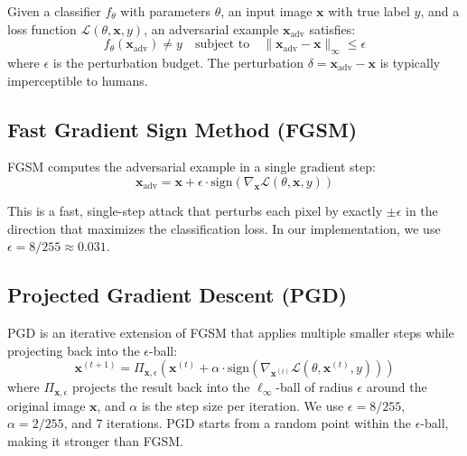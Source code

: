 \documentclass[12pt, a4paper]{article}
\begin{document}
Given a classifier $f_\theta$ with parameters $\theta$, an input image
$\mathbf{x}$ with true label $y$, and a loss function
$\mathcal{L}(\theta, \mathbf{x}, y)$, an adversarial example
$\mathbf{x}_{\mathrm{adv}}$ satisfies:
\begin{equation}
    f_\theta(\mathbf{x}_{\mathrm{adv}}) \neq y
    \quad \text{subject to} \quad
    \|\mathbf{x}_{\mathrm{adv}} - \mathbf{x}\|_\infty \leq \epsilon
\end{equation}
where $\epsilon$ is the perturbation budget. The perturbation
$\delta = \mathbf{x}_{\mathrm{adv}} - \mathbf{x}$ is typically
imperceptible to humans.

\subsection{Fast Gradient Sign Method (FGSM)}

FGSM \cite{goodfellow2015explaining} computes the adversarial example in
a single gradient step:
\begin{equation}
    \mathbf{x}_{\mathrm{adv}} = \mathbf{x} + \epsilon \cdot
    \mathrm{sign}\!\left(\nabla_{\mathbf{x}}
    \mathcal{L}(\theta, \mathbf{x}, y)\right)
\end{equation}

This is a fast, single-step attack that perturbs each pixel by exactly
$\pm\epsilon$ in the direction that maximizes the classification loss.
In our implementation, we use $\epsilon = 8/255 \approx 0.031$.

\subsection{Projected Gradient Descent (PGD)}

PGD \cite{madry2018towards} is an iterative extension of FGSM that
applies multiple smaller steps while projecting back into the
$\epsilon$-ball:
\begin{equation}
    \mathbf{x}^{(t+1)} = \Pi_{\mathbf{x}, \epsilon}\!\left(
    \mathbf{x}^{(t)} + \alpha \cdot \mathrm{sign}\!\left(
    \nabla_{\mathbf{x}^{(t)}}
    \mathcal{L}(\theta, \mathbf{x}^{(t)}, y)\right)\right)
\end{equation}
where $\Pi_{\mathbf{x}, \epsilon}$ projects the result back into the
$\ell_\infty$-ball of radius $\epsilon$ around the original image
$\mathbf{x}$, and $\alpha$ is the step size per iteration. We use
$\epsilon = 8/255$, $\alpha = 2/255$, and 7 iterations.  PGD starts from
a random point within the $\epsilon$-ball, making it stronger than FGSM.
\end{document}
